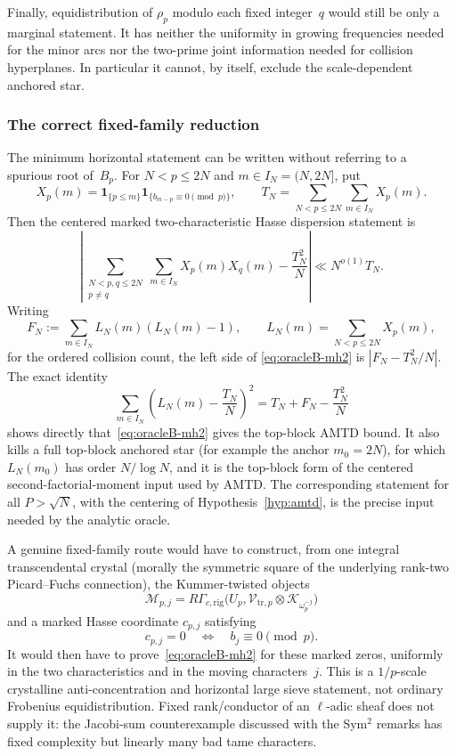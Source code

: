 Finally, equidistribution of $\rho_p$ modulo each fixed integer~$q$ would
still be only a marginal statement.  It has neither the uniformity in
growing frequencies needed for the minor arcs nor the two-prime joint
information needed for collision hyperplanes.  In particular it cannot,
by itself, exclude the scale-dependent anchored star.

\subsubsection{The correct fixed-family reduction}

The minimum horizontal statement can be written without referring to a
spurious root of~$B_p$.  For $N<p\leq2N$ and $m\in I_N=(N,2N]$, put
\[
 X_p(m)=\mathbf1_{\{p\leq m\}}
          \mathbf1_{\{b_{m-p}\equiv0\pmod p\}},
 \qquad
 T_N=\sum_{N<p\leq2N}\sum_{m\in I_N}X_p(m).
\]
Then the centered marked two-characteristic Hasse dispersion statement is
\begin{equation}
 \left|
 \sum_{\substack{N<p,q\leq2N\\p\ne q}}
 \sum_{m\in I_N}X_p(m)X_q(m)
 -\frac{T_N^2}{N}
 \right|
 \ll N^{o(1)}T_N.
 \label{eq:oracleB-mh2}
\end{equation}
Writing
\[
 F_N:=\sum_{m\in I_N}L_N(m)(L_N(m)-1),
\qquad L_N(m)=\sum_{N<p\leq2N}X_p(m),
\]
for the ordered collision count, the left side of
\eqref{eq:oracleB-mh2} is $|F_N-T_N^2/N|$.  The exact identity
\[
 \sum_{m\in I_N}\left(L_N(m)-\frac{T_N}{N}\right)^2
 =T_N+F_N-\frac{T_N^2}{N}
\]
shows directly that~\eqref{eq:oracleB-mh2} gives the top-block AMTD bound.
It also kills a full top-block anchored star (for example the anchor
$m_0=2N$), for which $L_N(m_0)$ has order $N/\log N$, and it is the
top-block form of the centered second-factorial-moment input used by AMTD.
The corresponding statement for all $P>\sqrt N$, with the centering of
Hypothesis~\ref{hyp:amtd}, is the precise input needed by the
analytic oracle.

A genuine fixed-family route would have to construct, from one integral
transcendental crystal (morally the symmetric square of the underlying
rank-two Picard--Fuchs connection), the Kummer-twisted objects
\begin{equation}
 \mathcal M_{p,j}=
 R\Gamma_{c,\mathrm{rig}}
 \bigl(U_p,\mathcal V_{\mathrm{tr},p}
       \otimes\mathcal K_{\omega_p^{-j}}\bigr)
 \label{eq:oracleB-crystalline-mellin}
\end{equation}
and a marked Hasse coordinate $c_{p,j}$ satisfying
\[
 c_{p,j}=0\quad\Longleftrightarrow\quad b_j\equiv0\pmod p.
\]
It would then have to prove~\eqref{eq:oracleB-mh2} for these marked zeros,
uniformly in the two characteristics and in the moving characters~$j$.
This is a $1/p$-scale crystalline anti-concentration and horizontal large
sieve statement, not ordinary Frobenius equidistribution.  Fixed
rank/conductor of an $\ell$-adic sheaf does not supply it: the Jacobi-sum
counterexample discussed with the Sym$^2$ remarks has fixed complexity but
linearly many bad tame characters.

